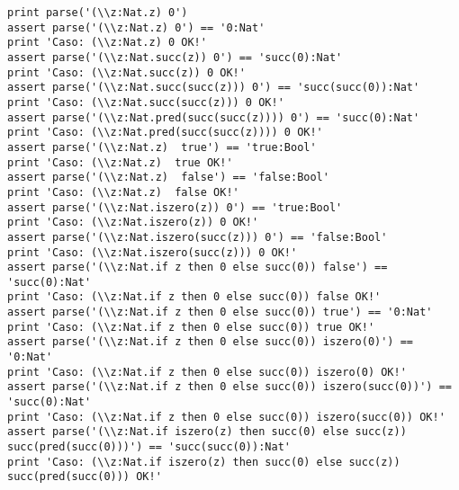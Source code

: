 \begin{verbatim}
print parse('(\\z:Nat.z) 0')
assert parse('(\\z:Nat.z) 0') == '0:Nat'
print 'Caso: (\\z:Nat.z) 0 OK!'
assert parse('(\\z:Nat.succ(z)) 0') == 'succ(0):Nat'
print 'Caso: (\\z:Nat.succ(z)) 0 OK!'
assert parse('(\\z:Nat.succ(succ(z))) 0') == 'succ(succ(0)):Nat'
print 'Caso: (\\z:Nat.succ(succ(z))) 0 OK!'
assert parse('(\\z:Nat.pred(succ(succ(z)))) 0') == 'succ(0):Nat'
print 'Caso: (\\z:Nat.pred(succ(succ(z)))) 0 OK!'
assert parse('(\\z:Nat.z)  true') == 'true:Bool'
print 'Caso: (\\z:Nat.z)  true OK!'
assert parse('(\\z:Nat.z)  false') == 'false:Bool'
print 'Caso: (\\z:Nat.z)  false OK!'
assert parse('(\\z:Nat.iszero(z)) 0') == 'true:Bool'
print 'Caso: (\\z:Nat.iszero(z)) 0 OK!'
assert parse('(\\z:Nat.iszero(succ(z))) 0') == 'false:Bool'
print 'Caso: (\\z:Nat.iszero(succ(z))) 0 OK!'
assert parse('(\\z:Nat.if z then 0 else succ(0)) false') == 'succ(0):Nat'
print 'Caso: (\\z:Nat.if z then 0 else succ(0)) false OK!'
assert parse('(\\z:Nat.if z then 0 else succ(0)) true') == '0:Nat'
print 'Caso: (\\z:Nat.if z then 0 else succ(0)) true OK!'
assert parse('(\\z:Nat.if z then 0 else succ(0)) iszero(0)') == '0:Nat'
print 'Caso: (\\z:Nat.if z then 0 else succ(0)) iszero(0) OK!'
assert parse('(\\z:Nat.if z then 0 else succ(0)) iszero(succ(0))') == 'succ(0):Nat'
print 'Caso: (\\z:Nat.if z then 0 else succ(0)) iszero(succ(0)) OK!'
assert parse('(\\z:Nat.if iszero(z) then succ(0) else succ(z)) succ(pred(succ(0)))') == 'succ(succ(0)):Nat'
print 'Caso: (\\z:Nat.if iszero(z) then succ(0) else succ(z)) succ(pred(succ(0))) OK!'


\end{verbatim}
